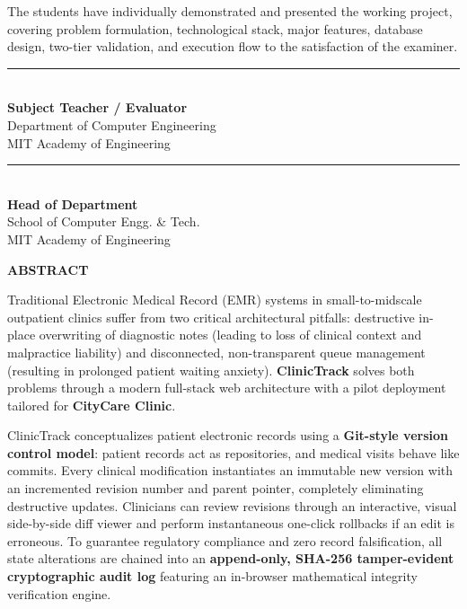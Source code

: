 \documentclass[12pt,a4paper,oneside]{report}
\begin{document}
\vspace{1.0cm}

The students have individually demonstrated and presented the working project, covering problem formulation, technological stack, major features, database design, two-tier validation, and execution flow to the satisfaction of the examiner.

\vspace{2.5cm}

\noindent
\begin{minipage}[t]{0.45\textwidth}
    \centering
    \rule{5.5cm}{0.4pt} \\
    \textbf{Subject Teacher / Evaluator} \\
    Department of Computer Engineering \\
    MIT Academy of Engineering
\end{minipage}
\hfill
\begin{minipage}[t]{0.45\textwidth}
    \centering
    \rule{5.5cm}{0.4pt} \\
    \textbf{Head of Department} \\
    School of Computer Engg. \& Tech. \\
    MIT Academy of Engineering
\end{minipage}

\newpage
\thispagestyle{plain}
\begin{center}
    {\Large\bfseries\color{ctDark} ABSTRACT \par}
\end{center}
\vspace{0.5cm}

Traditional Electronic Medical Record (EMR) systems in small-to-midscale outpatient clinics suffer from two critical architectural pitfalls: destructive in-place overwriting of diagnostic notes (leading to loss of clinical context and malpractice liability) and disconnected, non-transparent queue management (resulting in prolonged patient waiting anxiety). \textbf{ClinicTrack} solves both problems through a modern full-stack web architecture with a pilot deployment tailored for \textbf{CityCare Clinic}. 

ClinicTrack conceptualizes patient electronic records using a \textbf{Git-style version control model}: patient records act as repositories, and medical visits behave like commits. Every clinical modification instantiates an immutable new version with an incremented revision number and parent pointer, completely eliminating destructive updates. Clinicians can review revisions through an interactive, visual side-by-side diff viewer and perform instantaneous one-click rollbacks if an edit is erroneous. To guarantee regulatory compliance and zero record falsification, all state alterations are chained into an \textbf{append-only, SHA-256 tamper-evident cryptographic audit log} featuring an in-browser mathematical integrity verification engine.
\end{document}
